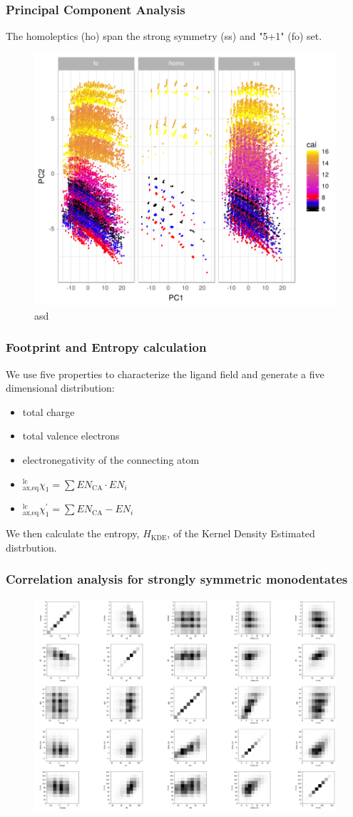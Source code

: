 \documentclass[xcolor=dvipsnames]{beamer}
\begin{document}
\begin{frame}
\frametitle{Principal Component Analysis}
The homoleptics (ho) span the strong symmetry (ss) and "5+1" (fo) set.
\begin{figure}
\includegraphics[width=0.65\linewidth]{img/pca.pdf}
\caption{asd} 
\end{figure}
\end{frame}

\begin{frame}
	\frametitle{Footprint and Entropy calculation}
	We use five properties to characterize the ligand field and generate a five dimensional distribution:
	\begin{itemize}
	\item total charge
	\item total valence electrons
	\item electronegativity of the connecting atom
	\item $^{\textrm{lc}}_{\textrm{ax,eq}}\chi_1 = \sum{EN_{\textrm{CA}} \cdot EN_i}$
	\item $^{\textrm{lc}}_{\textrm{ax,eq}}\chi^\prime_1 = \sum{EN_{\textrm{CA}} - EN_i}$
	
	\end{itemize}
	We then calculate the entropy, $H_{\textrm{KDE}}$, of the Kernel Density Estimated distrbution.
\end{frame}

\begin{frame}
\frametitle{Correlation analysis for strongly symmetric monodentates }
\begin{figure}
\includegraphics[width=0.65\linewidth]{img/strongsymMonodentates_PairwiseCorr.png}
\end{figure}
\end{frame}
\end{document}
